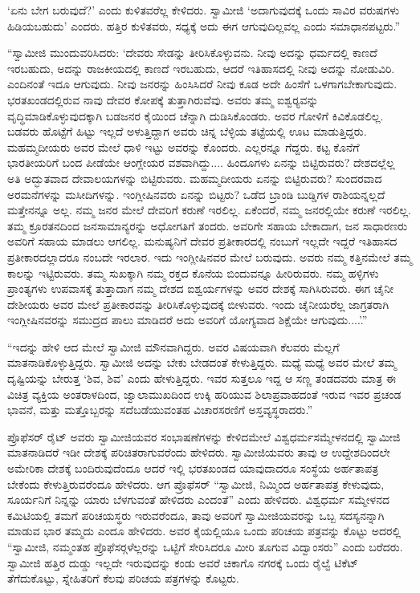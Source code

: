  ‘ಏನು ಬೇಗ ಬರುವುದೆ?’ ಎಂದು ಕುಳಿತವರೆಲ್ಲ ಕೇಳಿದರು. ಸ್ವಾಮೀಜಿ ‘ಅದಾಗುವುದಕ್ಕೆ ಒಂದು ಸಾವಿರ ವರುಷಗಳು ಹಿಡಿಯಬಹುದು’ ಎಂದರು. ಹತ್ತಿರ ಕುಳಿತವರು, ಸಧ್ಯಕ್ಕೆ ಅದು ಈಗ ಆಗುವುದಿಲ್ಲವಲ್ಲ ಎಂದು ಸಮಾಧಾನಪಟ್ಟರು.” 

 “ಸ್ವಾಮೀಜಿ ಮುಂದುವರಿಸಿದರು: ‘ದೇವರು ಸೇಡನ್ನು ತೀರಿಸಿಕೊಳ್ಳುವನು. ನೀವು ಅದನ್ನು ಧರ್ಮದಲ್ಲಿ ಕಾಣದೆ ಇರಬಹುದು, ಅದನ್ನು ರಾಜಕೀಯದಲ್ಲಿ ಕಾಣದೆ ಇರಬಹುದು, ಆದರೆ ಇತಿಹಾಸದಲ್ಲಿ ನೀವು ಅದನ್ನು ನೋಡುವಿರಿ. ಎಂದಿನಂತೆ ಇದೂ ಆಗುವುದು. ನೀವು ಜನರನ್ನು ಹಿಂಸಿಸಿದರೆ ನೀವು ಕೂಡ ಅದೇ ಹಿಂಸೆಗೆ ಒಳಗಾಗಬೇಕಾಗುವುದು. ಭರತಖಂಡದಲ್ಲಿರುವ ನಾವು ದೇವರ ಕೋಪಕ್ಕೆ ತುತ್ತಾಗಿರುವೆವು. ಅವರು ತಮ್ಮ ಐಶ್ವರ‍್ಯವನ್ನು ವೃದ್ಧಿಮಾಡಿಕೊಳ್ಳುವುದಕ್ಕಾಗಿ ಬಡಜನರ ಕೈಯಿಂದ ಚೆನ್ನಾಗಿ ದುಡಿಸಿಕೊಂಡರು. ಅವರ ಗೋಳಿಗೆ ಕಿವಿಕೊಡಲಿಲ್ಲ. ಬಡವರು ಹೊಟ್ಟೆಗೆ ಹಿಟ್ಟು ಇಲ್ಲದೆ ಅಳುತ್ತಿದ್ದಾಗ ಅವರು ಚಿನ್ನ ಬೆಳ್ಳಿಯ ತಟ್ಟೆಯಲ್ಲಿ ಊಟ ಮಾಡುತ್ತಿದ್ದರು. ಮಹಮ್ಮದೀಯರು ಅವರ ಮೇಲೆ ಧಾಳಿ ಇಟ್ಟು ಅವರನ್ನು ಕೊಂದರು. ಎಲ್ಲರನ್ನೂ ಗೆದ್ದರು. ಕಟ್ಟ ಕೊನೆಗೆ ಭಾರತೀಯರಿಗೆ ಬಂದ ಪೀಡೆಯೇ ಆಂಗ್ಲೇಯರ ವಶವಾಗಿದ್ದು.... ಹಿಂದೂಗಳು ಏನನ್ನು ಬಿಟ್ಟಿರುವರು? ದೇಶದಲ್ಲೆಲ್ಲ ಅತಿ ಅದ್ಭುತವಾದ ದೇವಾಲಯಗಳನ್ನು ಬಿಟ್ಟಿರುವರು. ಮಹಮ್ಮದೀಯರು ಏನನ್ನು ಬಿಟ್ಟಿರುವರು? ಸುಂದರವಾದ ಅರಮನೆಗಳನ್ನು ಮಸೀದಿಗಳನ್ನು. ಇಂಗ್ಲೀಷಿನವರು ಏನನ್ನು ಬಿಟ್ಟರು? ಒಡೆದ ಬ್ರಾಂಡಿ ಬುಡ್ಡಿಗಳ ರಾಶಿಯನ್ನಲ್ಲದೆ ಮತ್ತೇನನ್ನೂ ಅಲ್ಲ. ನಮ್ಮ ಜನರ ಮೇಲೆ ದೇವರಿಗೆ ಕರುಣೆ ಇರಲಿಲ್ಲ. ಏಕೆಂದರೆ, ನಮ್ಮ ಜನರಲ್ಲಿಯೇ ಕರುಣೆ ಇರಲಿಲ್ಲ. ತಮ್ಮ ಕ್ರೂರತನದಿಂದ ಜನಸಾಮಾನ್ಯರನ್ನು ಅಧೋಗತಿಗೆ ತಂದರು. ಅವರಿಗೇ ಸಹಾಯ ಬೇಕಾದಾಗ, ಜನ ಸಾಧಾರಣರು ಅವರಿಗೆ ಸಹಾಯ ಮಾಡಲು ಆಗಲಿಲ್ಲ. ಮನುಷ್ಯನಿಗೆ ದೇವರ ಪ್ರತೀಕಾರದಲ್ಲಿ ನಂಬುಗೆ ಇಲ್ಲದೇ ಇದ್ದರೆ ಇತಿಹಾಸದ ಪ್ರತೀಕಾರದಲ್ಲಾದರೂ ನಂಬದೇ ಇರಲಾರ. ಇದು ಇಂಗ್ಲೀಷಿನವರ ಮೇಲೆ ಬರುವುದು. ಅವರು ನಮ್ಮ ಕತ್ತಿನಮೇಲೆ ತಮ್ಮ ಕಾಲನ್ನು ಇಟ್ಟಿರುವರು. ತಮ್ಮ ಸುಖಕ್ಕಾಗಿ ನಮ್ಮ ರಕ್ತದ ಕೊನೆಯ ಬಿಂದುವನ್ನೂ ಹೀರಿರುವರು. ನಮ್ಮ ಹಳ್ಳಿಗಳು ಪ್ರಾಂತ್ಯಗಳು ಉಪವಾಸಕ್ಕೆ ತುತ್ತಾದಾಗ ನಮ್ಮ ದೇಶದ ಐಶ್ವರ್ಯಗಳನ್ನು ಅವರ ದೇಶಕ್ಕೆ ಸಾಗಿಸಿರುವರು. ಈಗ ಚೈನೀ ದೇಶೀಯರು ಅವರ ಮೇಲೆ ಪ್ರತೀಕಾರವನ್ನು ತೀರಿಸಿಕೊಳ್ಳುವುದಕ್ಕೆ ಬೀಳುವರು. ಇಂದು ಚೈನೀಯರೆಲ್ಲ ಜಾಗ್ರತರಾಗಿ ಇಂಗ್ಲೀಷಿನವರನ್ನು ಸಮುದ್ರದ ಪಾಲು ಮಾಡಿದರೆ ಅದು ಅವರಿಗೆ ಯೋಗ್ಯವಾದ ಶಿಕ್ಷೆಯೇ ಆಗುವುದು....’.” 

 “ಇದನ್ನು ಹೇಳಿ ಆದ ಮೇಲೆ ಸ್ವಾಮೀಜಿ ಮೌನವಾಗಿದ್ದರು. ಅವರ ವಿಷಯವಾಗಿ ಕೆಲವರು ಮೆಲ್ಲಗೆ ಮಾತನಾಡಿಕೊಳ್ಳುತ್ತಿದ್ದರು. ಸ್ವಾಮೀಜಿ ಅದನ್ನು ಬೇಕು ಬೇಡದಂತೆ ಕೇಳುತ್ತಿದ್ದರು. ಮಧ್ಯೆ ಮಧ್ಯೆ ಅವರ ಮೇಲೆ ತಮ್ಮ ದೃಷ್ಟಿಯನ್ನು ಬೇರುತ್ತ ‘ಶಿವ, ಶಿವ’ ಎಂದು ಹೇಳುತ್ತಿದ್ದರು. ಇವರ ಸುತ್ತಲೂ ಇದ್ದ ಆ ಸಣ್ಣ ತಂಡದವರು ಮಾತ್ರ ಈ ವಿಚಿತ್ರ ವ್ಯಕ್ತಿಯ ಅಂತರಾಳದಿಂದ, ಜ್ವಾಲಾಮುಖದಿಂದ ಉಕ್ಕಿ ಹರಿಯುವ ಶಿಲಾಪ್ರವಾಹದಂತೆ ಇರುವ ಇವರ ಪ್ರಚಂಡ ಭಾವನೆ, ಮತ್ತು ಮತ್ತೊಬ್ಬರನ್ನು ಸದೆಬಡೆಯುವಂತಹ ವಿಚಾರಸರಣಿಗೆ ಅಸ್ತವ್ಯಸ್ಥರಾದರು.” 

 ಪ್ರೊಫೆಸರ್ ರೈಟ್ ಅವರು ಸ್ವಾಮೀಜಿಯವರ ಸಂಭಾಷಣೆಗಳನ್ನು ಕೇಳಿದಮೇಲೆ ವಿಶ್ವಧರ್ಮಸಮ್ಮೇಳನದಲ್ಲಿ ಸ್ವಾಮೀಜಿ ಮಾತನಾಡಿದರೆ ಇಡೀ ದೇಶಕ್ಕೆ ಪರಿಚಿತರಾಗುವರೆಂದು ಹೇಳಿದರು. ಸ್ವಾಮೀಜಿಯವರು ತಾವು ಆ ಉದ್ದೇಶದಿಂದಲೇ ಅಮೇರಿಕಾ ದೇಶಕ್ಕೆ ಬಂದಿರುವುದೆಂದೂ ಆದರೆ ಇಲ್ಲಿ ಭರತಖಂಡದ ಯಾವುದಾದರೂ ಸಂಸ್ಥೆಯ ಅರ್ಹತಾಪತ್ರ ಬೇಕೆಂದು ಕೇಳುತ್ತಿರುವರೆಂದೂ ಹೇಳಿದರು. ಆಗ ಪ್ರೊಫೆಸರ್ “ಸ್ವಾಮೀಜಿ, ನಿಮ್ಮಿಂದ ಅರ್ಹತಾಪತ್ರ ಕೇಳುವುದು, ಸೂರ್ಯನಿಗೆ ನಿನ್ನನ್ನು ಯಾರು ಬೆಳಗುವಂತೆ ಹೇಳಿದರು ಎಂದಂತೆ” ಎಂದು ಹೇಳಿದರು. ವಿಶ್ವಧರ್ಮ ಸಮ್ಮೇಳನದ ಕಮಿಟಿಯಲ್ಲಿ ತಮಗೆ ಪರಿಚಯಸ್ಥರು ಇರುವರೆಂದೂ, ತಾವು ಅವರಿಗೆ ಸ್ವಾಮೀಜಿಯವರನ್ನು ಒಬ್ಬ ಸದಸ್ಯನನ್ನಾಗಿ ಮಾಡುವ ಭಾರ ತಮ್ಮದು ಎಂದೂ ಹೇಳಿದರು. ಅವರ ಕೈಯಲ್ಲಿಯೂ ಒಂದು ಪರಿಚಯ ಪತ್ರವನ್ನು ಕೊಟ್ಟು ಅದರಲ್ಲಿ “ಸ್ವಾಮೀಜಿ, ನಮ್ಮಂತಹ ಪ್ರೊಫೆಸರ್‍ಗಳೆಲ್ಲರನ್ನು ಒಟ್ಟಿಗೆ ಸೇರಿಸಿದರೂ ಮೀರಿ ತೂಗುವ ವಿದ್ವಾಂಸರು” ಎಂದು ಬರೆದರು. ಸ್ವಾಮೀಜಿ ಹತ್ತಿರ ದುಡ್ಡು ಇಲ್ಲದೇ ಇರುವುದನ್ನು ಕಂಡು ಅವರೆ ಚಿಕಾಗೊ ನಗರಕ್ಕೆ ಒಂದು ರೈಲ್ವೆ ಟಿಕೆಟ್ ತೆಗೆದುಕೊಟ್ಟು, ಸ್ನೇಹಿತರಿಗೆ ಕೆಲವು ಪರಿಚಯ ಪತ್ರಗಳನ್ನು ಕೊಟ್ಟರು. 

